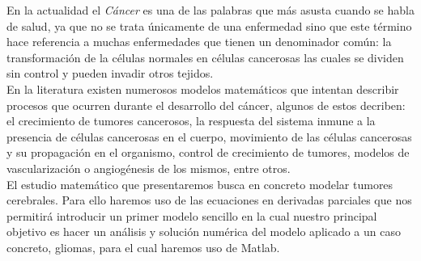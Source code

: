 En la actualidad el \textit{Cáncer} es una de las palabras que más asusta cuando se habla de salud, ya que no se trata únicamente de una enfermedad sino que este término hace referencia a muchas enfermedades que tienen un denominador común: la transformación de la células normales en células cancerosas las cuales se dividen sin control y pueden invadir otros tejidos.\\

En la literatura existen numerosos modelos matemáticos que intentan describir  procesos que ocurren durante el desarrollo del cáncer, algunos de estos decriben: el crecimiento de tumores cancerosos, la respuesta del sistema inmune a la presencia de células cancerosas en el cuerpo, movimiento de las células cancerosas y su propagación en el organismo, control de crecimiento de tumores, modelos de vascularización o angiogénesis de los mismos, entre otros.\\

El estudio  matemático que presentaremos busca en concreto modelar tumores cerebrales. Para ello haremos uso de las ecuaciones en derivadas parciales que nos permitirá introducir un primer modelo sencillo en la cual nuestro principal objetivo es hacer un análisis y solución numérica del modelo aplicado a un caso concreto, gliomas, para el cual haremos uso de Matlab.